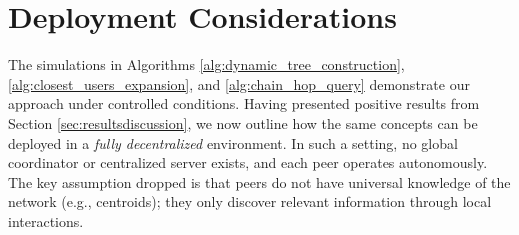 \documentclass[10pt,journal]{IEEEtran}
\begin{document}






\section{Deployment Considerations}
\label{sec:decentralized_impl}

The simulations in 
Algorithms \ref{alg:dynamic_tree_construction}, 
\ref{alg:closest_users_expansion}, 
and \ref{alg:chain_hop_query}
demonstrate our approach under controlled conditions. Having presented positive results from Section \ref{sec:resultsdiscussion}, we now outline how the same concepts can be deployed in a \emph{fully decentralized} environment. In such a setting, no global coordinator or centralized server exists, and each peer operates autonomously. The key assumption dropped is that peers do not have universal knowledge of the network (e.g., centroids); they only discover relevant information through local interactions. 
\end{document}
